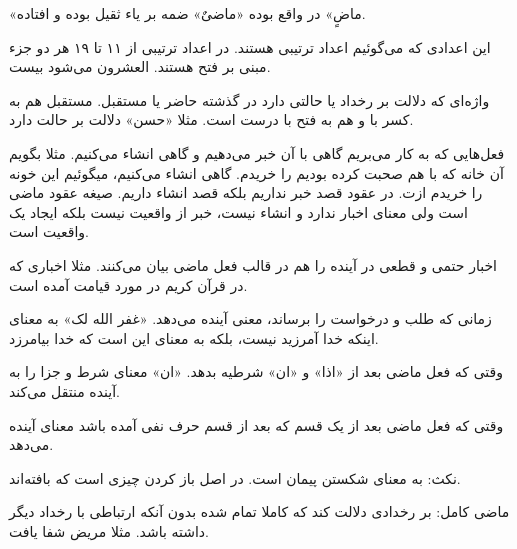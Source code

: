 \documentclass{article}
\begin{document}
\begin{addpage}{6}
  \vspace*{5cm}
  \begin{note}
    «ماضٍ» در واقع بوده «ماضیٌ» ضمه بر یاء ثقیل بوده و افتاده.
  \end{note}
  \begin{note}
    این اعدادی که می‌گوئیم اعداد ترتیبی هستند. در اعداد ترتیبی از ۱۱ تا ۱۹ هر دو جزء مبنی بر فتح هستند. العشرون می‌شود بیست.
  \end{note}
  \begin{note}
    واژه‌ای که دلالت بر رخداد یا حالتی دارد در گذشته حاضر یا مستقبل. مستقبل هم به کسر با و هم به فتح با درست است.
    مثلا «حسن» دلالت بر حالت دارد.
  \end{note}
  \begin{note}
    فعل‌هایی که به کار می‌بریم گاهی با آن خبر می‌دهیم و گاهی انشاء می‌کنیم. مثلا بگویم آن خانه که با هم صحبت کرده بودیم را خریدم. گاهی انشاء می‌کنیم، میگوئیم این خونه را خریدم ازت.
    در عقود قصد خبر نداریم بلکه قصد انشاء داریم. صیغه عقود ماضی است ولی معنای اخبار ندارد و انشاء نیست، خبر از واقعیت نیست بلکه ایجاد یک واقعیت است.
  \end{note}
  \begin{note}
    اخبار حتمی و قطعی در آینده را هم در قالب فعل ماضی بیان می‌کنند. مثلا اخباری که در قرآن کریم در مورد قیامت آمده است.
  \end{note}
  \begin{note}
    زمانی که طلب و درخواست را برساند، معنی آینده می‌دهد. «غفر الله لک» به معنای اینکه خدا آمرزید نیست، بلکه به معنای این است که خدا بیامرزد.

    وقتی که فعل ماضی بعد از «اذا» و «ان» شرطیه بدهد. «ان» معنای شرط و جزا را به آینده منتقل می‌کند.

    وقتی که فعل ماضی بعد از یک قسم که بعد از قسم حرف نفی آمده باشد معنای آینده می‌دهد.

    نکث: به معنای شکستن پیمان است. در اصل باز کردن چیزی است که بافته‌اند.
  \end{note}
  \begin{note}
    ماضی کامل: بر رخدادی دلالت کند که کاملا تمام شده بدون آنکه ارتباطی با رخداد دیگر داشته باشد. مثلا مریض شفا یافت.
  \end{note}
\end{addpage}
\end{document}
